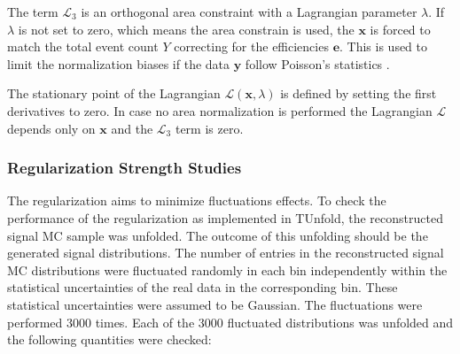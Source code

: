 The term $\mathcal{L}_{3}$ is an orthogonal area constraint with a Lagrangian parameter $\lambda$. If $\lambda$ is not set to zero,
which means the area constrain is used, the $\mathbf{x}$ is forced to match the total event count $Y$ correcting for the efficiencies $\mathbf{e}$.
This is used to limit the normalization biases if the data $\mathbf{y}$ follow Poisson's statistics \cite{Cowan98}.

The stationary point of the Lagrangian $\mathcal{L}(\mathbf{x}, \lambda)$ is defined by setting the first derivatives to zero. In case no 
area normalization is performed the Lagrangian $\mathcal{L}$ depends only on $\mathbf{x}$ and the $\mathcal{L}_{3}$ term is zero.

\subsubsection{Regularization Strength Studies}

The regularization aims to minimize fluctuations effects. To check the performance of the regularization as implemented in TUnfold, the reconstructed signal
MC sample was unfolded. The outcome of this unfolding should be the generated signal distributions. The number of entries in the reconstructed signal
MC distributions were fluctuated randomly in each bin independently within the statistical uncertainties of the real data in the corresponding bin. 
These statistical uncertainties were assumed to be Gaussian. The fluctuations were performed 3000 times. Each of the 3000 fluctuated distributions 
was unfolded and the following quantities were checked:

